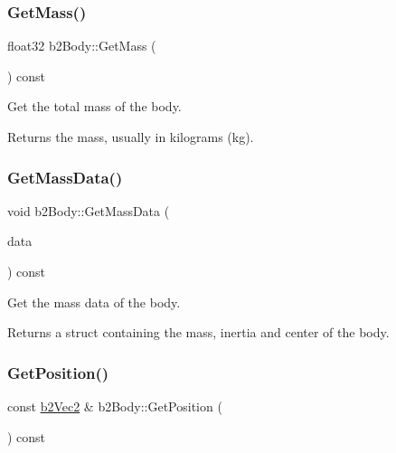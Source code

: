 \subsubsection{\texorpdfstring{Get\+Mass()}{GetMass()}}
{\footnotesize\ttfamily float32 b2\+Body\+::\+Get\+Mass (\begin{DoxyParamCaption}{ }\end{DoxyParamCaption}) const\hspace{0.3cm}{\ttfamily [inline]}}

Get the total mass of the body. \begin{DoxyReturn}{Returns}
the mass, usually in kilograms (kg). 
\end{DoxyReturn}
\mbox{\label{classb2Body_a5100927dbd39dd0addea79d5f323f3f1}} 
\subsubsection{\texorpdfstring{Get\+Mass\+Data()}{GetMassData()}}
{\footnotesize\ttfamily void b2\+Body\+::\+Get\+Mass\+Data (\begin{DoxyParamCaption}\item[{\mbox{\hyperlink{structb2MassData}{b2\+Mass\+Data}} $\ast$}]{data }\end{DoxyParamCaption}) const\hspace{0.3cm}{\ttfamily [inline]}}

Get the mass data of the body. \begin{DoxyReturn}{Returns}
a struct containing the mass, inertia and center of the body. 
\end{DoxyReturn}
\mbox{\label{classb2Body_a7944dc953ac0cb1e00b32bc61b50e70d}} 
\subsubsection{\texorpdfstring{Get\+Position()}{GetPosition()}}
{\footnotesize\ttfamily const \mbox{\hyperlink{structb2Vec2}{b2\+Vec2}} \& b2\+Body\+::\+Get\+Position (\begin{DoxyParamCaption}{ }\end{DoxyParamCaption}) const\hspace{0.3cm}{\ttfamily [inline]}}

